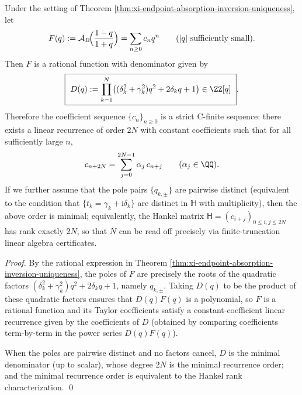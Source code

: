 \begin{corollary}\label{cor:xi-endpoint-profile-cfinite-hankel-rank}
Under the setting of Theorem \ref{thm:xi-endpoint-absorption-inversion-uniqueness}, let
\[
F(q):=\mathcal{A}_B\!\Bigl(\frac{1-q}{1+q}\Bigr)=\sum_{n\ge 0}c_n q^n\qquad(|q|\ \text{sufficiently small}).
\]
Then \(F\) is a rational function with denominator given by
\[
\boxed{\ D(q):=\prod_{k=1}^{N}\bigl((\delta_k^2+\gamma_k^2)q^2+2\delta_k q+1\bigr)\in\ZZ[q]\ }.
\]
Therefore the coefficient sequence \(\{c_n\}_{n\ge 0}\) is a strict C-finite sequence: there exists a linear recurrence of order \(2N\) with constant coefficients such that for all sufficiently large \(n\),
\[
c_{n+2N}=\sum_{j=0}^{2N-1}\alpha_j\,c_{n+j}\qquad(\alpha_j\in\QQ).
\]
If we further assume that the pole pairs \(\{q_{k,\pm}\}\) are pairwise distinct (equivalent to the condition that \(\{t_k=\gamma_k+\mathrm{i}\delta_k\}\) are distinct in \(\mathbb{H}\) with multiplicity), then the above order is minimal; equivalently, the Hankel matrix
\(
\mathsf{H}=(c_{i+j})_{0\le i,j\le 2N}
\)
has rank exactly \(2N\), so that \(N\) can be read off precisely via finite-truncation linear algebra certificates.
\end{corollary}
\begin{proof}
By the rational expression in Theorem \ref{thm:xi-endpoint-absorption-inversion-uniqueness}, the poles of \(F\) are precisely the roots of the quadratic factors
\(
(\delta_k^2+\gamma_k^2)q^2+2\delta_k q+1
\),
namely \(q_{k,\pm}\). Taking \(D(q)\) to be the product of these quadratic factors ensures that \(D(q)F(q)\) is a polynomial, so \(F\) is a rational function and its Taylor coefficients satisfy a constant-coefficient linear recurrence given by the coefficients of \(D\) (obtained by comparing coefficients term-by-term in the power series \(D(q)F(q)\)).
\par
When the poles are pairwise distinct and no factors cancel, \(D\) is the minimal denominator (up to scalar), whose degree \(2N\) is the minimal recurrence order; and the minimal recurrence order is equivalent to the Hankel rank characterization. \qed
\end{proof}

